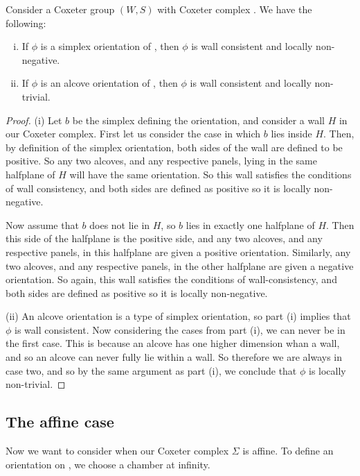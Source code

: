 \documentclass[11pt]{article}
\begin{document}
\begin{lemma}\cite[?]{SHA}
    Consider a Coxeter group $(W,S)$ with Coxeter complex \sg. We have the following:
    \begin{enumerate}[(i)]
        \item If $\phi$ is a simplex orientation of \sg, then $\phi$ is wall consistent and locally non-negative.
        \item If $\phi$ is an alcove orientation of \sg, then $\phi$ is wall consistent and locally non-trivial.
    \end{enumerate}
\end{lemma}

\begin{proof}
    (i) Let $b$ be the simplex defining the orientation, and consider a wall $H$ in our Coxeter complex. First let us consider the case in which $b$ lies inside $H$. Then, by definition of the simplex orientation, both sides of the wall are defined to be positive. So any two alcoves, and any respective panels, lying in the same halfplane of $H$ will have the same orientation. So this wall satisfies the conditions of wall consistency, and both sides are defined as positive so it is locally non-negative. 
    
    Now assume that $b$ does not lie in $H$, so $b$ lies in exactly one halfplane of $H$. Then this side of the halfplane is the positive side, and any two alcoves, and any respective panels, in this halfplane are given a positive orientation. Similarly, any two alcoves, and any respective panels, in the other halfplane are given a negative orientation. So again, this wall satisfies the conditions of wall-consistency, and both sides are defined as positive so it is locally non-negative. 

    (ii) An alcove orientation is a type of simplex orientation, so part (i) implies that $\phi$ is wall consistent. Now considering the cases from part (i), we can never be in the first case. This is because an alcove has one higher dimension whan a wall, and so an alcove can never fully lie within a wall. So therefore we are always in case two, and so by the same argument as part (i), we conclude that $\phi$ is locally non-trivial. 
\end{proof}

\subsection{The affine case}

Now we want to consider when our Coxeter complex $\Sigma$ is affine. To define an orientation on \sg, we choose a chamber at infinity.
\end{document}
